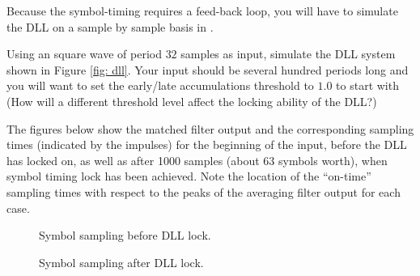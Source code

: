 Because the symbol-timing requires a feed-back loop, you will
have to simulate the DLL on a sample by sample basis in \matlab.

Using an square wave of period $32$ samples as input, simulate
the DLL system shown in Figure \ref{fig: dll}.  Your input
should be several hundred periods long and you will want to
set the early/late accumulations threshold to $1.0$ to start with 
(How will a different threshold level affect the locking ability of the DLL?)

The figures below show the matched filter output and the corresponding
sampling times (indicated by the impulses) for the beginning 
of the input, before the DLL has locked on, as well as after
1000 samples (about 63 symbols worth), when symbol timing lock has
been achieved.  Note the location of the ``on-time'' sampling times
with respect to the peaks of the averaging filter output
for each case.
 
\begin{figure}[ht]
   \begin{center}
      \caption{Symbol sampling before DLL lock.}
      \label{fig: dll_before_lock}
   \end{center}
\end{figure}

\begin{figure}[ht]
   \begin{center}
      \caption{Symbol sampling after DLL lock.}
      \label{fig: dll_after_lock}
   \end{center}
\end{figure}

